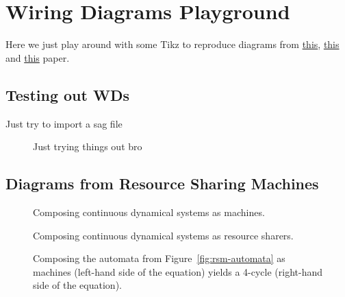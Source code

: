\section{Wiring Diagrams Playground}

Here we just play around with some Tikz to reproduce diagrams from \href{https://arxiv.org/pdf/2007.14442}{this}, \href{https://arxiv.org/pdf/2105.12282}{this} and \href{https://arxiv.org/pdf/2503.05457}{this} paper.
\subsection{Testing out WDs}


Just try to import a sag file

\begin{figure}[h]
	\centering
    \caption{Just trying things out bro}
    \label{fig:WD-test}
\end{figure}

\subsection{Diagrams from Resource Sharing Machines}


\begin{figure}[h]
	\centering
	\caption{Composing continuous dynamical systems as machines.}
	\label{fig:CDS-growth-machine}
\end{figure}

\begin{figure}[h]
	\centering
	\caption{Composing continuous dynamical systems as resource sharers.}
	\label{fig:CDS-rs}
\end{figure}

\begin{figure}[h]
    \centering
    \caption{ Composing the automata from Figure~\ref{fig:rsm-automata} as machines (left-hand side of the equation) yields a 4-cycle (right-hand side of the equation).}
    \label{fig:rsm-automata-machine}
\end{figure}

